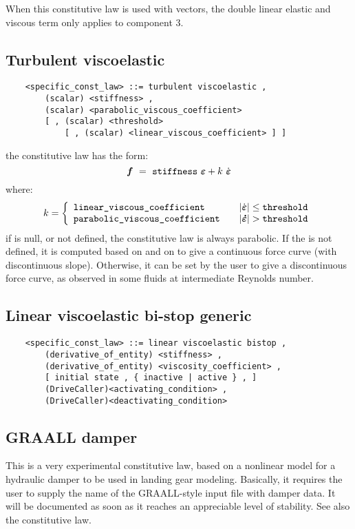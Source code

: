 When this constitutive law is used with  vectors, 
the double linear elastic and viscous term only applies to component 3.
  
\subsection{Turbulent viscoelastic}
\begin{verbatim}
    <specific_const_law> ::= turbulent viscoelastic ,
        (scalar) <stiffness> ,
        (scalar) <parabolic_viscous_coefficient>
        [ , (scalar) <threshold> 
            [ , (scalar) <linear_viscous_coefficient> ] ]
\end{verbatim}
the constitutive law has the form:
\begin{displaymath}
    \T{f} \ = \ \kw{stiffness} \ \T{\varepsilon} + k \ \dot{\T{\varepsilon}}
\end{displaymath}
where:
\begin{displaymath}
    k = \lcubr{\matr{lcr}{
        \kw{linear\_viscous\_coefficient} & & 
            \shbr{\dot{\T{\varepsilon}}} \leq \kw{threshold} \\
        \kw{parabolic\_viscous\_coefficient} & &
            \shbr{\T{\dot{\varepsilon}}} > \kw{threshold}
    }}
\end{displaymath}
if  is null, or not defined, the constitutive law is always
parabolic. If the  is not defined, it is
computed based on  and on 
 to give a continuous force curve (with discontinuous slope).
Otherwise, it can be set by the user to give a discontinuous force curve,
as observed in some fluids at intermediate Reynolds number.

\subsection{Linear viscoelastic bi-stop generic}
\begin{verbatim}
    <specific_const_law> ::= linear viscoelastic bistop ,
        (derivative_of_entity) <stiffness> ,
        (derivative_of_entity) <viscosity_coefficient> ,
        [ initial state , { inactive | active } , ]
        (DriveCaller)<activating_condition> ,
        (DriveCaller)<deactivating_condition>
\end{verbatim}
  
\subsection{GRAALL damper}
This is a very experimental constitutive law, based on a nonlinear model
for a hydraulic damper to be used in landing gear modeling.
Basically, it requires the user to supply the name of the GRAALL-style 
input file with damper data.
It will be documented as soon as it reaches an appreciable level of
stability.
See also the 
constitutive law.


